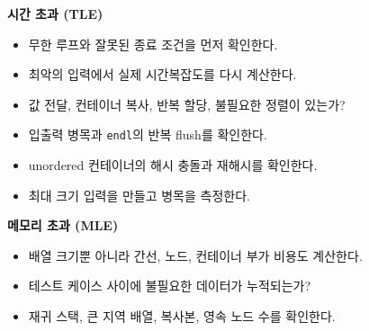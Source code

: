 \textbf{시간 초과 (TLE)}
\begin{itemize}
  \item 무한 루프와 잘못된 종료 조건을 먼저 확인한다.
  \item 최악의 입력에서 실제 시간복잡도를 다시 계산한다.
  \item 값 전달, 컨테이너 복사, 반복 할당, 불필요한 정렬이 있는가?
  \item 입출력 병목과 \texttt{endl}의 반복 flush를 확인한다.
  \item unordered 컨테이너의 해시 충돌과 재해시를 확인한다.
  \item 최대 크기 입력을 만들고 병목을 측정한다.
\end{itemize}

\textbf{메모리 초과 (MLE)}
\begin{itemize}
  \item 배열 크기뿐 아니라 간선, 노드, 컨테이너 부가 비용도 계산한다.
  \item 테스트 케이스 사이에 불필요한 데이터가 누적되는가?
  \item 재귀 스택, 큰 지역 배열, 복사본, 영속 노드 수를 확인한다.
\end{itemize}
\endgroup

